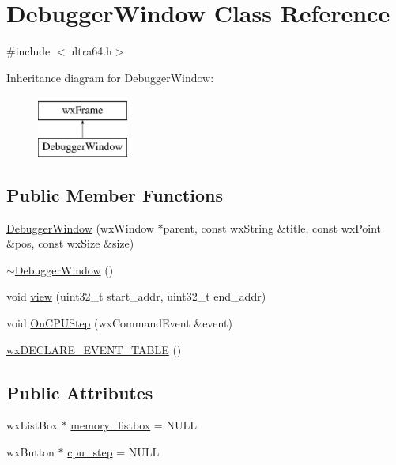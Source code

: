 \hypertarget{class_debugger_window}{}\section{Debugger\+Window Class Reference}
\label{class_debugger_window}


{\ttfamily \#include $<$ultra64.\+h$>$}

Inheritance diagram for Debugger\+Window\+:\begin{figure}[H]
\begin{center}
\leavevmode
\includegraphics[height=2.000000cm]{class_debugger_window}
\end{center}
\end{figure}
\subsection*{Public Member Functions}
\begin{DoxyCompactItemize}
\item 
\hyperlink{class_debugger_window_ae72a6bed32d587f5dc4d301242ae5720}{Debugger\+Window} (wx\+Window $\ast$parent, const wx\+String \&title, const wx\+Point \&pos, const wx\+Size \&size)
\item 
\hyperlink{class_debugger_window_a59bb9cc5a75d6d953d940c112c5a38a3}{$\sim$\+Debugger\+Window} ()
\item 
void \hyperlink{class_debugger_window_a58b244eaf8947c48629eca294a4aa37b}{view} (uint32\+\_\+t start\+\_\+addr, uint32\+\_\+t end\+\_\+addr)
\item 
void \hyperlink{class_debugger_window_a00a164c597b3faa9c69360e60cb55cf6}{On\+C\+P\+U\+Step} (wx\+Command\+Event \&event)
\item 
\hyperlink{class_debugger_window_a4ec20c97fe9716957caf2d4c19cdaff4}{wx\+D\+E\+C\+L\+A\+R\+E\+\_\+\+E\+V\+E\+N\+T\+\_\+\+T\+A\+B\+LE} ()
\end{DoxyCompactItemize}
\subsection*{Public Attributes}
\begin{DoxyCompactItemize}
\item 
wx\+List\+Box $\ast$ \hyperlink{class_debugger_window_a5907a83225613994ce1bf78e170f3e69}{memory\+\_\+listbox} = N\+U\+LL
\item 
wx\+Button $\ast$ \hyperlink{class_debugger_window_a8cbfc7ff4b60b4ce45f94af2771e222a}{cpu\+\_\+step} = N\+U\+LL
\end{DoxyCompactItemize}


